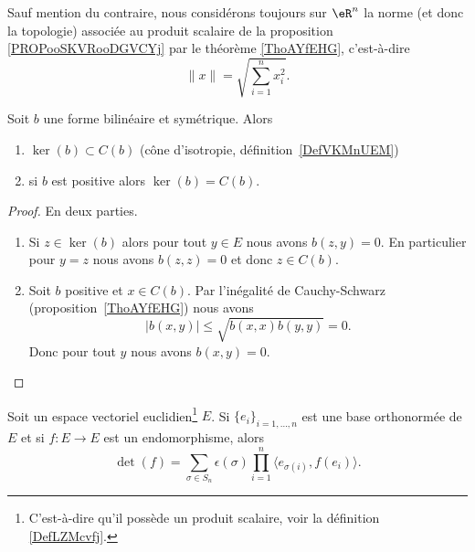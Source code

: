 \begin{definition}        \label{DEFooJAGXooMgaUsR}
	Sauf mention du contraire, nous considérons toujours sur \( \eR^n\) la norme (et donc la topologie) associée au produit scalaire de la proposition \ref{PROPooSKVRooDGVCYj} par le théorème \ref{ThoAYfEHG}, c'est-à-dire
	\begin{equation}
		\| x \|=\sqrt{ \sum_{i=1}^nx_i^2 }.
	\end{equation}
\end{definition}

\begin{proposition}     \label{PropHIWjdMX}
	Soit \( b\) une forme bilinéaire et symétrique. Alors
	\begin{enumerate}
		\item
		      \( \ker(b)\subset C(b)\) (cône d'isotropie, définition~\ref{DefVKMnUEM})
		\item
		      si \( b\) est positive alors \( \ker(b)=C(b)\).
	\end{enumerate}
\end{proposition}

\begin{proof}
	En deux parties.
	\begin{enumerate}
		\item
		      Si \( z\in\ker(b)\) alors pour tout \( y\in E\) nous avons \( b(z,y)=0\). En particulier pour \( y=z\) nous avons \( b(z,z)=0\) et donc \( z\in C(b)\).
		\item
		      Soit \( b\) positive et \( x\in C(b)\). Par l'inégalité de Cauchy-Schwarz (proposition~\ref{ThoAYfEHG}) nous avons
		      \begin{equation}
			      | b(x,y) |\leq \sqrt{   b(x,x)b(y,y) }=0.
		      \end{equation}
		      Donc pour tout \( y\) nous avons \( b(x,y)=0\).
	\end{enumerate}
\end{proof}


\begin{lemma}       \label{LEMooEZFIooXyYybe}
	Soit un espace vectoriel euclidien\footnote{C'est-à-dire qu'il possède un produit scalaire, voir la définition \ref{DefLZMcvfj}.} \( E\). Si \( \{ e_i \}_{i=1,\ldots, n}\) est une base orthonormée de \( E\) et si \( f\colon E\to E\) est un endomorphisme, alors
	\begin{equation}        \label{EQooQAZLooZutFUz}
		\det(f)=\sum_{\sigma\in S_n}\epsilon(\sigma)\prod_{i=1}^n\langle e_{\sigma(i)}, f(e_i)\rangle.
	\end{equation}
\end{lemma}

